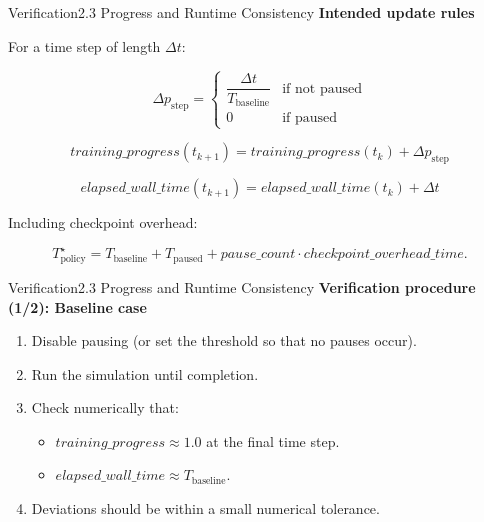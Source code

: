 \begin{frame}{Verification}{2.3 Progress and Runtime Consistency}
  \textbf{Intended update rules}

  For a time step of length $\Delta t$:

  \[
    \Delta p_{\text{step}} =
    \begin{cases}
      \dfrac{\Delta t}{T_{\text{baseline}}} & \text{if not paused} \\
      0 & \text{if paused}
    \end{cases}
  \]

  \[
    \mathit{training\_progress}(t_{k+1}) =
    \mathit{training\_progress}(t_k) + \Delta p_{\text{step}}
  \]

  \[
    \mathit{elapsed\_wall\_time}(t_{k+1}) =
    \mathit{elapsed\_wall\_time}(t_k) + \Delta t
  \]

  Including checkpoint overhead:

  \[
    T_{\text{policy}}^{\star} =
    T_{\text{baseline}} + T_{\text{paused}} +
    \mathit{pause\_count} \cdot \mathit{checkpoint\_overhead\_time}.
  \]
\end{frame}

\begin{frame}{Verification}{2.3 Progress and Runtime Consistency}
  \textbf{Verification procedure (1/2): Baseline case}
  \begin{enumerate}
    \item Disable pausing (or set the threshold so that no pauses occur).
    \item Run the simulation until completion.
    \item Check numerically that:
      \begin{itemize}
        \item $\mathit{training\_progress} \approx 1.0$ at the final time step.
        \item $\mathit{elapsed\_wall\_time} \approx T_{\text{baseline}}$.
      \end{itemize}
    \item Deviations should be within a small numerical tolerance.
  \end{enumerate}
\end{frame}

